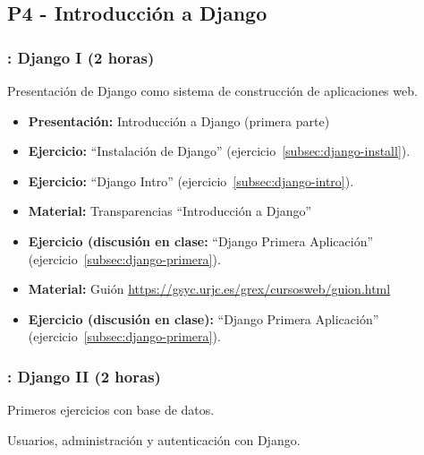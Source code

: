 \documentclass[a4paper,12pt]{article}
\begin{document}
\subsection{P4 - Introducción a Django}

\subsubsection{\juevesG: Django I (2 horas)}
\label{cal:juevesG}

Presentación de Django como sistema de construcción de aplicaciones web.

\begin{itemize}
 \item \textbf{Presentación:} Introducción a Django (primera parte)
 \item \textbf{Ejercicio:} ``Instalación de Django'' (ejercicio~\ref{subsec:django-install}).
 \item \textbf{Ejercicio:} ``Django Intro'' (ejercicio~\ref{subsec:django-intro}).
 \item \textbf{Material:} Transparencias ``Introducción a Django''
 \item \textbf{Ejercicio (discusión en clase:} ``Django Primera Aplicación'' (ejercicio~\ref{subsec:django-primera}).
 \item \textbf{Material:} Guión \url{https://gsyc.urjc.es/grex/cursosweb/guion.html}
 \item \textbf{Ejercicio (discusión en clase):} ``Django Primera Aplicación'' (ejercicio~\ref{subsec:django-primera}).

\end{itemize}


\subsubsection{\juevesH: Django II (2 horas)}
\label{cal:juevesH}

Primeros ejercicios con base de datos.

Usuarios, administración y autenticación con Django.
\end{document}
